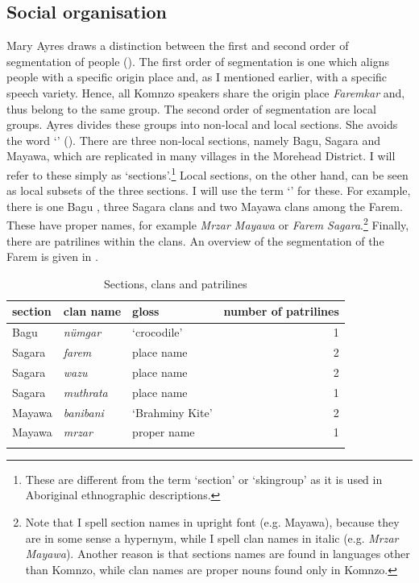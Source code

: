 \subsection{Social organisation}\label{segmentationofpeople}

Mary Ayres draws a distinction between the first and second order of segmentation of people (\citeyear[126]{Ayres:ws}). The first order of segmentation is one which aligns people with a specific origin place and, as I mentioned earlier, with a specific speech variety. Hence, all Komnzo speakers share the origin place \emph{Faremkar} and, thus belong to the same group. The second order of segmentation are local groups. Ayres divides these groups into non-local and local sections. She avoids the word `' (\citeyear[142]{Ayres:ws}). There are three non-local sections, namely Bagu, Sagara and Mayawa, which are replicated in many villages in the Morehead District. I will refer to these simply as `sections'.\footnote{These are different from the term `section' or `skingroup' as it is used in Aboriginal ethnographic descriptions.} Local sections, on the other hand, can be seen as local subsets of the three sections. I will use the term `' for these. For example, there is one Bagu , three Sagara clans and two Mayawa clans among the Farem. These have proper names, for example \emph{Mrzar Mayawa} or \emph{Farem Sagara}.\footnote{Note that I spell section names in upright font (e.g. Mayawa), because they are in some sense a hypernym, while I spell clan names in italic (e.g. \emph{Mrzar Mayawa}). Another reason is that sections names are found in languages other than Komnzo, while clan names are proper nouns found only in Komnzo.} Finally, there are patrilines within the clans. An overview of the segmentation of the Farem is given in .

\begin{table}
\caption{Sections, clans and patrilines}
\label{peopleseg}
	\begin{tabularx}{\textwidth}{XXXr}
		\lsptoprule
			 {section} 			&  {clan name} 	&  {gloss} 	&  {number of patrilines}\\
			 \midrule
			Bagu						& \emph{nümgar} 		& `crocodile' 		& 1\\
			Sagara						& \emph{farem} 			& place name 		& 2\\
			Sagara						& \emph{wazu} 			& place name 		& 2\\
			Sagara						& \emph{muthrata} 		& place name 		& 1\\
			Mayawa 						& \emph{banibani} 		& `Brahminy Kite'	& 2\\
			Mayawa						& \emph{mrzar} 			& proper name 		& 1\\
		\lspbottomrule
	\end{tabularx}
\end{table}

